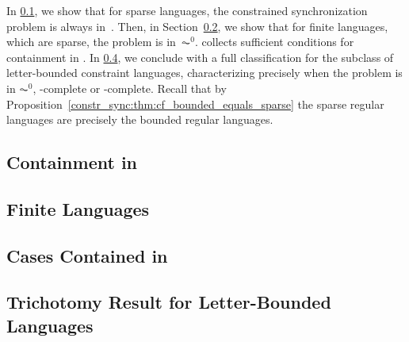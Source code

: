 

 In \cref{constr_sync:subsec:sparse_NP}, 
we show that for sparse languages, the constrained synchronization problem is always in~\NP.
Then, in Section~\ref{sec:constr_sync:finite}, 
we show that for finite languages, which are sparse, the problem is in~$\AC^0$.
collects sufficient conditions for containment in \LOGSPACE. 
In \cref{constrsync:sec:letter-bounded:trichotomy}, we conclude with a full classification for the subclass of letter-bounded constraint languages, characterizing
precisely when the problem is in $\AC^0$, \LOGSPACE-complete or \NP-complete. %
Recall that by Proposition~\ref{constr_sync:thm:cf_bounded_equals_sparse} the sparse regular languages are precisely the 
bounded regular languages.

%
%


\subsection{Containment in \NP}
\label{constr_sync:subsec:sparse_NP}



\subsection{Finite Languages}
\label{sec:constr_sync:finite}



\subsection{Cases Contained in \LOGSPACE}
\label{constr_sync:subsec:sparse_L}



\subsection{Trichotomy Result for Letter-Bounded Languages}
\label{constrsync:sec:letter-bounded:trichotomy}

